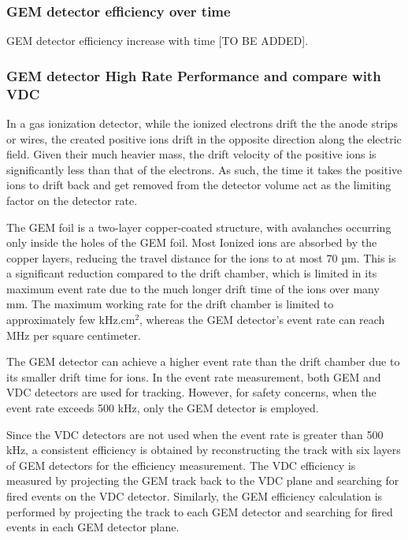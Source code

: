\subsubsection{GEM detector efficiency over time}

GEM detector efficiency increase with time [TO BE ADDED]. 

%
%
\subsubsection{GEM detector High Rate Performance and compare with VDC}
In a gas ionization detector, while the ionized electrons drift the the anode strips or wires, the created positive ions drift in the opposite direction along the electric field. Given their much heavier mass, the drift velocity of the positive ions is significantly less than that of the electrons. As such, the time it takes the positive ions to drift back and get removed from the detector volume act as the limiting factor on the detector rate. 

The GEM foil is a two-layer copper-coated structure, with avalanches occurring only inside the holes of the GEM foil. Most Ionized ions are absorbed by the copper layers, reducing the travel distance  for the ions to at most 70 µm. This is a significant reduction compared to the drift chamber, which is limited in its maximum event rate due to the much longer drift time of the ions over many mm. The maximum working rate for the drift chamber is limited to approximately few kHz.cm$^2$, whereas the GEM detector's event rate can reach MHz per square centimeter. 

The GEM detector can achieve a higher event rate than the drift chamber due to its smaller drift time for ions. In the event rate measurement, both GEM and VDC detectors are used for tracking. However, for safety concerns, when the event rate exceeds 500 kHz, only the GEM detector is employed.

Since the VDC detectors are  not used when the event rate is greater than 500 kHz, a consistent efficiency is obtained by reconstructing the track with six layers of GEM detectors for the efficiency measurement. The VDC efficiency is measured by projecting the GEM track back to the VDC plane and searching for fired events on the VDC detector. Similarly, the GEM efficiency calculation is performed by projecting the track to each GEM detector and searching for fired events in each GEM detector plane.

